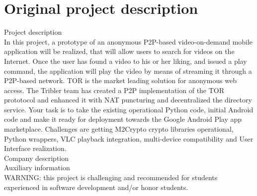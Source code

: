 \chapter{Original project description}
\label{chp:originaldescription}

	Project description\cite{originalprojectdescription}\\
	
	In this project, a prototype of an anonymous P2P-based video-on-demand mobile application will be realized, that will allow users to search for videos on the Internet. Once the user has found a video to his or her liking, and issued a play command, the application will play the video by means of streaming it through a P2P-based network. TOR is the market leading solution for anonymous web access. The Tribler team has created a P2P implementation of the TOR prototocol and enhanced it with NAT puncturing and decentralized the directory service. Your task is to take the existing operational Python code, initial Android code and make it ready for deployment towards the Google Android Play app marketplace. Challenges are getting M2Crypto crypto libraries operational, Python wrappers, VLC playback integration, multi-device compatibility and User Interface realization.\\
	
	Company description\\
	
	Auxiliary information\\
	
	WARNING: this project is challenging and recommended for students experienced in software development and/or honor students.